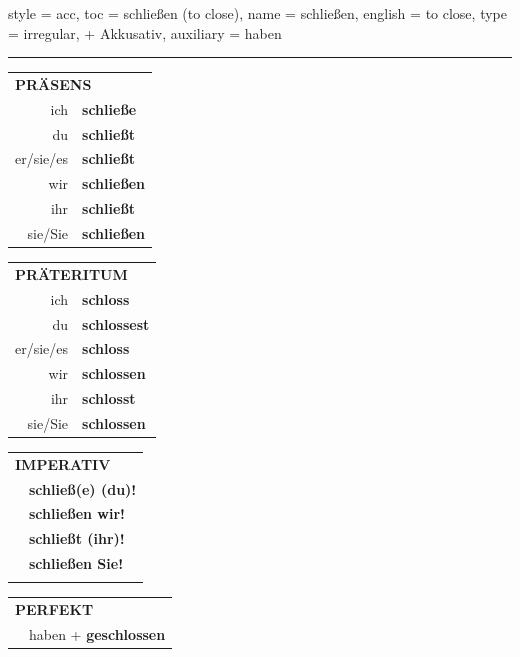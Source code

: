 \begin{verbentry}{
  style = {acc},
  toc = {schließen (to close)},
  name = {schließen},
  english = {to close},
  type = {irregular, + Akkusativ},
  auxiliary = {haben}
}
 
    
     \vspace{5pt}

    \hrule
    
    \vspace{5pt}

  \begin{tabular}{rl}
     \multicolumn{2}{l}{\textbf{PRÄSENS} }\\
    ich & \textbf{schließe}\\
    du & \textbf{schließt}\\
    er/sie/es & \textbf{schließt}\\
    wir & \textbf{schließen}\\
    ihr & \textbf{schließt}\\
    sie/Sie & \textbf{schließen}\\
  \end{tabular}
  \hfill
     \begin{tabular}{rl}
    \multicolumn{2}{l}{\textbf{PRÄTERITUM} }\\
    ich & \textbf{schloss}\\
    du & \textbf{schlossest}\\
    er/sie/es & \textbf{schloss}\\
    wir & \textbf{schlossen}\\
    ihr & \textbf{schlosst}\\
    sie/Sie & \textbf{schlossen}\\
  \end{tabular}
  \hfill
  \begin{tabular}{rl}
     \multicolumn{2}{l}{\textbf{IMPERATIV} }\\
   & \textbf{schließ(e) (du)!}\\
   & \textbf{schließen wir!}\\
   & \textbf{schließt (ihr)!}\\
   & \textbf{schließen Sie!}\\
   & \vspace{10pt}
  \end{tabular}

    \vspace{10pt}

 \begin{tabular}{rl}
     \multicolumn{2}{l}{\textbf{PERFEKT}}\\
   & haben + \textbf{geschlossen}\\
  \end{tabular}
\hfill
   \begin{tabular}{rl}
   

\end{tabular}
\end{verbentry}
